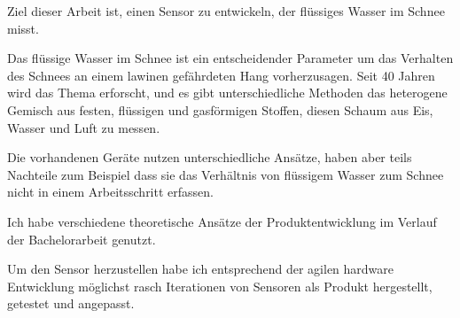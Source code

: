 Ziel dieser Arbeit ist, einen Sensor zu entwickeln, der flüssiges Wasser im Schnee misst.

Das flüssige Wasser im Schnee ist ein entscheidender Parameter um das Verhalten des Schnees an einem lawinen gefährdeten Hang  vorherzusagen. Seit 40 Jahren wird das Thema erforscht,  und es gibt unterschiedliche Methoden das heterogene Gemisch aus festen, flüssigen und gasförmigen Stoffen, diesen Schaum aus Eis, Wasser und Luft zu messen.

Die vorhandenen Geräte nutzen unterschiedliche Ansätze, haben aber teils  Nachteile zum Beispiel dass sie das Verhältnis von flüssigem Wasser zum Schnee nicht in einem Arbeitsschritt erfassen.

Ich habe verschiedene theoretische Ansätze der Produktentwicklung im Verlauf der Bachelorarbeit genutzt.

Um den Sensor herzustellen habe ich entsprechend der agilen hardware Entwicklung möglichst rasch Iterationen von Sensoren als Produkt hergestellt, getestet und angepasst.

\iffalse
ziel dieser Arbeit ist die entwicklung eines innovativen sensors um die scheefeuchtigkeit zu messen.

Die schneefeuchtigkeit ist ein entscheidenen Parameter um Gleitschneelawinen abzuschetzten. seit 40 jahren ist wird Thema beforscht. Es gibt verschiedenste Techniken um den Schaum aus Eis, Wasser und Luft zu messen. heutige Produkte konnen den LWC messen, haben aber verschiedene schwerwigeende nachteile.

um dieses Produktentwicklung an zu gehen werden verschiedene techniken der Produktentwicklung eingesetzt. um ein sensor zu erreichen der einsatztfahig ist, wurde nach aglier hardware entwicklung moglichst schnell Itterationen von sensoren entwickelt.

\fi
